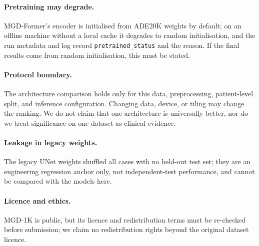 \paragraph{Pretraining may degrade.} MGD-Former's encoder is initialised from ADE20K weights by default; on an offline machine without a local cache it degrades to random initialisation, and the run metadata and log record \texttt{pretrained\_status} and the reason. If the final results come from random initialisation, this must be stated.

\paragraph{Protocol boundary.} The architecture comparison holds only for this data, preprocessing, patient-level split, and inference configuration. Changing data, device, or tiling may change the ranking. We do not claim that one architecture is universally better, nor do we treat significance on one dataset as clinical evidence.

\paragraph{Leakage in legacy weights.} The legacy UNet weights shuffled all \nTotal{} cases with no held-out test set; they are an engineering regression anchor only, not independent-test performance, and cannot be compared with the models here.

\paragraph{Licence and ethics.} MGD-1K is public, but its licence and redistribution terms must be re-checked before submission; we claim no redistribution rights beyond the original dataset licence.

